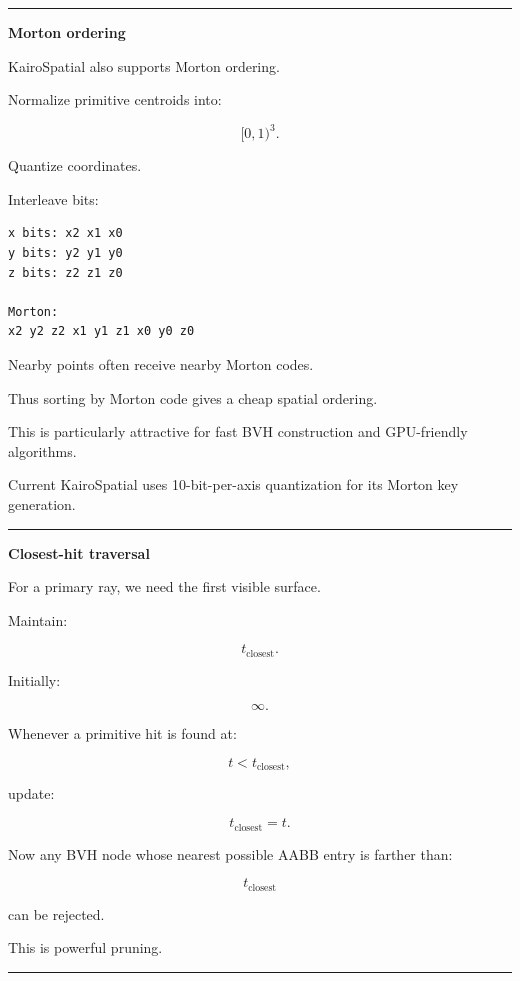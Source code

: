 \begin{center}\rule{0.5\linewidth}{0.5pt}\end{center}

\textbf{Morton ordering}

KairoSpatial also supports Morton ordering.

Normalize primitive centroids into:

\[
[0,1)^3.
\]

Quantize coordinates.

Interleave bits:

\begin{verbatim}
x bits: x2 x1 x0
y bits: y2 y1 y0
z bits: z2 z1 z0

Morton:
x2 y2 z2 x1 y1 z1 x0 y0 z0
\end{verbatim}

Nearby points often receive nearby Morton codes.

Thus sorting by Morton code gives a cheap spatial ordering.

This is particularly attractive for fast BVH construction and GPU-friendly algorithms.

Current KairoSpatial uses 10-bit-per-axis quantization for its Morton key generation.

\begin{center}\rule{0.5\linewidth}{0.5pt}\end{center}

\textbf{Closest-hit traversal}

For a primary ray, we need the first visible surface.

Maintain:

\[
t_{\text{closest}}.
\]

Initially:

\[
\infty.
\]

Whenever a primitive hit is found at:

\[
t<t_{\text{closest}},
\]

update:

\[
t_{\text{closest}}=t.
\]

Now any BVH node whose nearest possible AABB entry is farther than:

\[
t_{\text{closest}}
\]

can be rejected.

This is powerful pruning.

\begin{center}\rule{0.5\linewidth}{0.5pt}\end{center}

